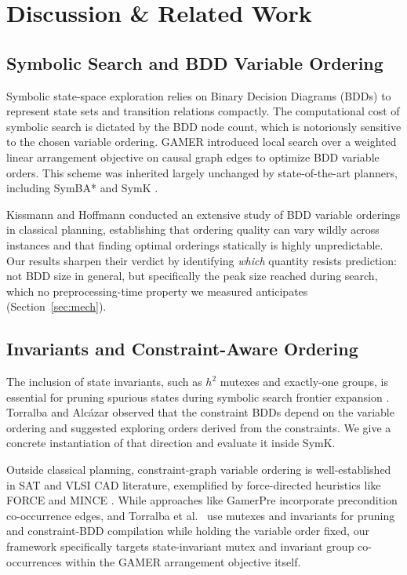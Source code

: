 \documentclass[twocolumn,10pt]{article}
\begin{document}
\section{Discussion \& Related Work}

\subsection{Symbolic Search and BDD Variable Ordering}
Symbolic state-space exploration relies on Binary Decision Diagrams (BDDs) to represent state sets and transition relations compactly. The computational cost of symbolic search is dictated by the BDD node count, which is notoriously sensitive to the chosen variable ordering. \textsf{GAMER} \cite{edelkamp2008gamer} introduced local search over a weighted linear arrangement objective on causal graph edges to optimize BDD variable orders. This scheme was inherited largely unchanged by state-of-the-art planners, including \textsf{SymBA*} \cite{torralba2014symba} and \textsf{SymK} \cite{speck2020symk, speck2023symkipc}.

Kissmann and Hoffmann \cite{kissmann2014bdd} conducted an extensive study of BDD variable orderings in classical planning, establishing that ordering quality can vary wildly across instances and that finding optimal orderings statically is highly unpredictable. Our results sharpen their verdict by identifying \emph{which} quantity resists prediction: not BDD size in general, but specifically the peak size reached during search, which no preprocessing-time property we measured anticipates (Section~\ref{sec:mech}).

\subsection{Invariants and Constraint-Aware Ordering}
The inclusion of state invariants, such as $h^2$ mutexes and exactly-one groups, is essential for pruning spurious states during symbolic search frontier expansion \cite{torralba2013constrained}. Torralba and Alc\'azar \cite{torralba2013constrained} observed that the constraint BDDs depend on the variable ordering and suggested exploring orders derived from the constraints. We give a concrete instantiation of that direction and evaluate it inside \textsf{SymK}.

Outside classical planning, constraint-graph variable ordering is well-established in SAT and VLSI CAD literature, exemplified by force-directed heuristics like \textsf{FORCE} and \textsf{MINCE} \cite{aloul2003force}. While approaches like \textsf{GamerPre} \cite{kissmann2014bdd} incorporate precondition co-occurrence edges, and Torralba et al.\ \cite{torralba2017efficient} use mutexes and invariants for pruning and constraint-BDD compilation while holding the variable order fixed, our framework specifically targets state-invariant mutex and invariant group co-occurrences within the \textsf{GAMER} arrangement objective itself.
\end{document}
